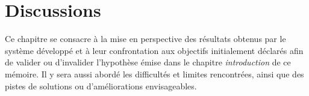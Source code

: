 \chapter{Discussions}
Ce chapitre se consacre à la mise en perspective des résultats obtenus par le système développé et à leur confrontation aux objectifs initialement déclarés afin de valider ou d'invalider l'hypothèse émise dans le chapitre \textit{introduction} de ce mémoire. Il y sera aussi abordé les difficultés et limites rencontrées, ainsi que des pistes de solutions ou d'améliorations envisageables.